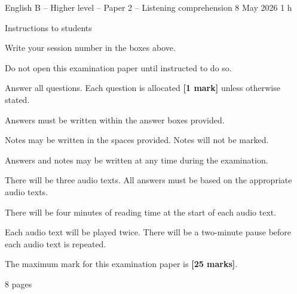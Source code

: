 \documentclass[11pt,a4paper]{article}
\begin{document}
\ibcover
  {English B -- Higher level -- Paper 2 -- Listening comprehension}
  {8 May 2026}
  {1 h}
  {\begin{ibinstructions}{Instructions to students}
     \item Write your session number in the boxes above.
     \item Do not open this examination paper until instructed to do so.
     \item Answer all questions. Each question is allocated \textbf{[1 mark]}
           unless otherwise stated.
     \item Answers must be written within the answer boxes provided.
     \item Notes may be written in the spaces provided. Notes will not be marked.
     \item Answers and notes may be written at any time during the examination.
     \item There will be three audio texts. All answers must be based on the
           appropriate audio texts.
     \item There will be four minutes of reading time at the start of each
           audio text.
     \item Each audio text will be played twice. There will be a two-minute
           pause before each audio text is repeated.
     \item The maximum mark for this examination paper is \textbf{[25 marks]}.
   \end{ibinstructions}}
  {8 pages}
  {\ibsessioncode}

\end{document}
